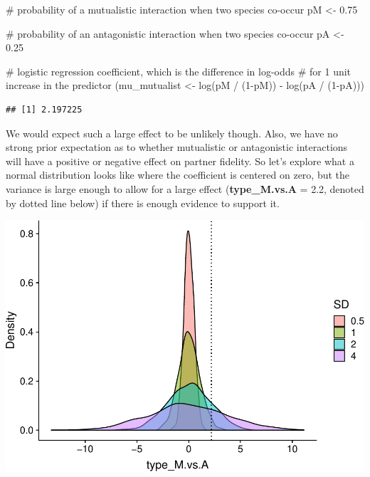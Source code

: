 \documentclass[11pt,]{article}
\newenvironment{Shaded}{}{}
\newcommand{\KeywordTok}[1]{\textcolor[rgb]{0.00,0.00,1.00}{#1}}
\newcommand{\DecValTok}[1]{#1}
\newcommand{\FloatTok}[1]{#1}
\newcommand{\StringTok}[1]{\textcolor[rgb]{0.00,0.50,0.50}{#1}}
\newcommand{\CommentTok}[1]{\textcolor[rgb]{0.00,0.50,0.00}{#1}}
\newcommand{\OperatorTok}[1]{#1}
\newcommand{\NormalTok}[1]{#1}
\let\origfigure\figure
\let\endorigfigure\endfigure
\renewenvironment{figure}[1][2] {
    \expandafter\origfigure\expandafter[H]
} {
    \endorigfigure
}
\begin{document}
\begin{Shaded}
\begin{Highlighting}[]
\CommentTok{# probability of a mutualistic interaction when two species co-occur}
\NormalTok{pM <-}\StringTok{ }\FloatTok{0.75}  

\CommentTok{# probability of an antagonistic interaction when two species co-occur}
\NormalTok{pA <-}\StringTok{ }\FloatTok{0.25} 

\CommentTok{# logistic regression coefficient, which is the difference in log-odds }
\CommentTok{# for 1 unit increase in the predictor}
\NormalTok{(mu_mutualist <-}\StringTok{ }\KeywordTok{log}\NormalTok{(pM }\OperatorTok{/}\StringTok{ }\NormalTok{(}\DecValTok{1}\OperatorTok{-}\NormalTok{pM)) }\OperatorTok{-}\StringTok{ }\KeywordTok{log}\NormalTok{(pA }\OperatorTok{/}\StringTok{ }\NormalTok{(}\DecValTok{1}\OperatorTok{-}\NormalTok{pA))) }
\end{Highlighting}
\end{Shaded}

\begin{verbatim}
## [1] 2.197225
\end{verbatim}

We would expect such a large effect to be unlikely though. Also, we have
no strong prior expectation as to whether mutualistic or antagonistic
interactions will have a positive or negative effect on partner
fidelity. So let's explore what a normal distribution looks like where
the coefficient is centered on zero, but the variance is large enough to
allow for a large effect (\textbf{type\_M.vs.A} = 2.2, denoted by dotted
line below) if there is enough evidence to support it.

\begin{figure}
\centering
\includegraphics{reproduce_analyses_files/figure-latex/simulate prior distribution for type-1.pdf}
\caption{Simulating prior distributions for the effect of interaction
type.}
\end{figure}
\end{document}
